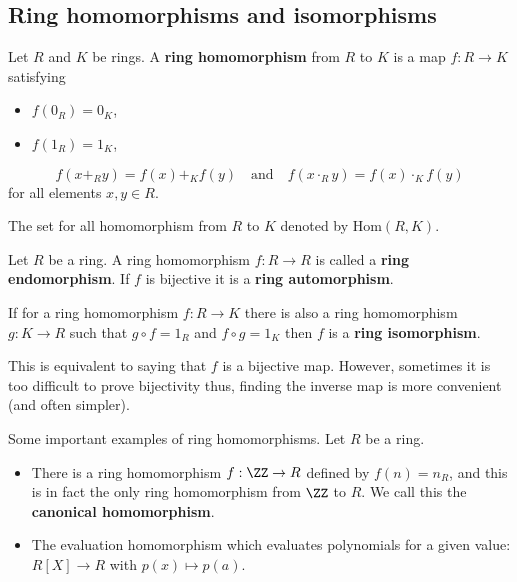 \documentclass[12pt, a4paper]{article}
\begin{document}
\subsection{Ring homomorphisms and isomorphisms}

\begin{definition}
    Let \(R\) and \(K\) be rings. A \textbf{ring homomorphism} from \(R\) to \(K\) is a map \(f:R \to K\) satisfying 
    \begin{itemize}
        \item \(f(0_R)=0_K\),
        \item \(f(1_R)=1_K\),
    \end{itemize}
    \[f(x+_R y)=f(x)+_K f(y) \quad \text{and} \quad f(x \cdot_R y)=f(x) \cdot_K f(y)\]
    for all elements \(x,y \in R\).
\end{definition}

\begin{definition}
    The set for all homomorphism from \(R\) to \(K\) denoted by \(\text{Hom}(R,K)\).
\end{definition}

\begin{definition}
    Let \(R\) be a ring. A ring homomorphism \(f :R \to R\) is called a \textbf{ring endomorphism}. If \(f\) is bijective it is a \textbf{ring automorphism}.
\end{definition}

\begin{definition}
    If for a ring homomorphism \(f:R \to K\) there is also a ring homomorphism \(g:K \to R\) such that \(g\circ f =1_R\) and \(f \circ g=1_K\) then \(f\) is a \textbf{ring isomorphism}.
\end{definition}

\begin{mdnote}
    This is equivalent to saying that \(f\) is a bijective map. However, sometimes it is too difficult to prove bijectivity thus, finding the inverse map is more convenient (and often simpler).
\end{mdnote}

\begin{mdexample}
    Some important examples of ring homomorphisms. Let \(R\) be a ring. 
    \begin{itemize}
        \item There is a ring homomorphism \(f:\ZZ \to R\) defined by \(f(n)=n_R\), and this is in fact the only ring homomorphism from \(\ZZ\) to \(R\). We call this the \textbf{canonical homomorphism}.
        \item The evaluation homomorphism which evaluates polynomials for a given value: \(R[X] \to R\) with \(p(x)\mapsto p(a)\).
    \end{itemize}
\end{mdexample}
\end{document}
